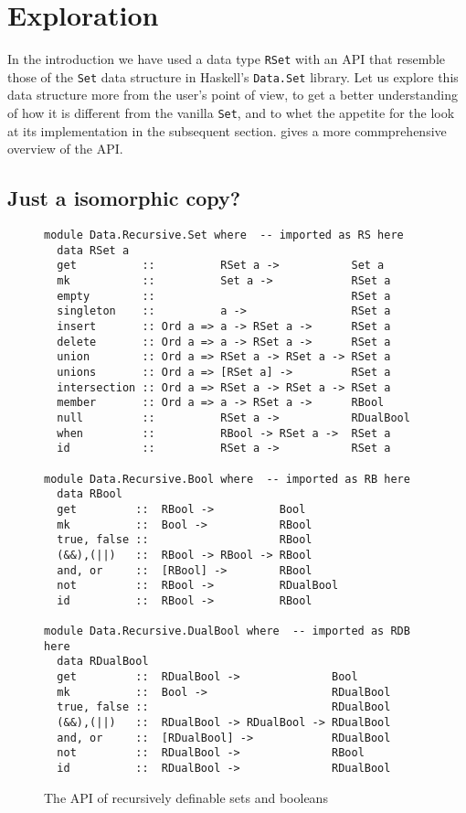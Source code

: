 \documentclass[manuscript,screen,acmsmall]{acmart}
\begin{document}
\section{Exploration}\label{sec:exploration}

In the introduction we have used a data type \verb|RSet| with an API that resemble those of the \verb|Set| data structure in Haskell's \verb|Data.Set| library. Let us explore this data structure more from the user's point of view, to get a better understanding of how it is different from the vanilla \verb|Set|, and to whet the appetite for the look at its implementation in the subsequent section.
 gives a more commprehensive overview of the API.

\subsection{Just a isomorphic copy?}

\begin{figure}
\begin{verbatim}
module Data.Recursive.Set where  -- imported as RS here
  data RSet a
  get          ::          RSet a ->           Set a
  mk           ::          Set a ->            RSet a
  empty        ::                              RSet a
  singleton    ::          a ->                RSet a
  insert       :: Ord a => a -> RSet a ->      RSet a
  delete       :: Ord a => a -> RSet a ->      RSet a
  union        :: Ord a => RSet a -> RSet a -> RSet a
  unions       :: Ord a => [RSet a] ->         RSet a
  intersection :: Ord a => RSet a -> RSet a -> RSet a
  member       :: Ord a => a -> RSet a ->      RBool
  null         ::          RSet a ->           RDualBool
  when         ::          RBool -> RSet a ->  RSet a
  id           ::          RSet a ->           RSet a

module Data.Recursive.Bool where  -- imported as RB here
  data RBool
  get         ::  RBool ->          Bool
  mk          ::  Bool ->           RBool
  true, false ::                    RBool
  (&&),(||)   ::  RBool -> RBool -> RBool
  and, or     ::  [RBool] ->        RBool
  not         ::  RBool ->          RDualBool
  id          ::  RBool ->          RBool

module Data.Recursive.DualBool where  -- imported as RDB here
  data RDualBool
  get         ::  RDualBool ->              Bool
  mk          ::  Bool ->                   RDualBool
  true, false ::                            RDualBool
  (&&),(||)   ::  RDualBool -> RDualBool -> RDualBool
  and, or     ::  [RDualBool] ->            RDualBool
  not         ::  RDualBool ->              RBool
  id          ::  RDualBool ->              RDualBool
\end{verbatim}
\caption{The API of recursively definable sets and booleans}\label{fig:api}
\end{figure}
\end{document}
